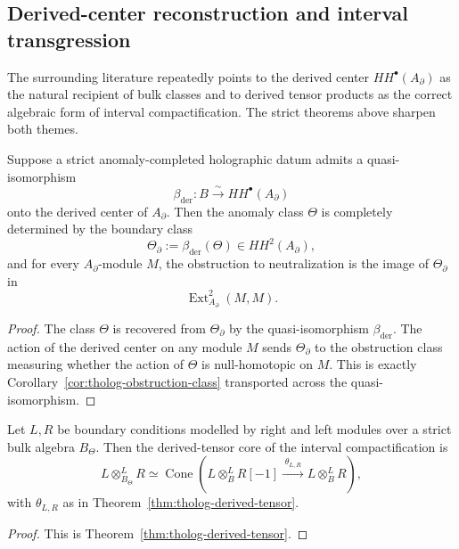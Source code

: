 \subsection{Derived-center reconstruction and interval transgression}
\label{subsec:tholog-derived-center-reconstruction}

The surrounding literature repeatedly points to the derived center \(HH^{\bullet}(A_{\partial})\) as the natural recipient of bulk classes and to derived tensor products as the correct algebraic form of interval compactification.
The strict theorems above sharpen both themes.

\begin{proposition}
\label{prop:tholog-boundary-reconstruction}
Suppose a strict anomaly-completed holographic datum admits a quasi-isomorphism
\[
\beta_{\mathrm{der}}:B\stackrel{\sim}{\longrightarrow} HH^{\bullet}(A_{\partial})
\]
onto the derived center of \(A_{\partial}\).
Then the anomaly class \(\Theta\) is completely determined by the boundary class
\[
\Theta_{\partial}:=\beta_{\mathrm{der}}(\Theta)\in HH^{2}(A_{\partial}),
\]
and for every \(A_{\partial}\)-module \(M\), the obstruction to neutralization is the image of \(\Theta_{\partial}\) in
\[
\operatorname{Ext}^{2}_{A_{\partial}}(M,M).
\]
\end{proposition}

\begin{proof}
The class \(\Theta\) is recovered from \(\Theta_{\partial}\) by the quasi-isomorphism \(\beta_{\mathrm{der}}\).
The action of the derived center on any module \(M\) sends \(\Theta_{\partial}\) to the obstruction class measuring whether the action of \(\Theta\) is null-homotopic on \(M\).
This is exactly Corollary~\ref{cor:tholog-obstruction-class} transported across the quasi-isomorphism.
\end{proof}

\begin{corollary}
\label{cor:tholog-interval-transgression-formula}
Let \(L,R\) be boundary conditions modelled by right and left modules over a strict bulk algebra \(B_{\Theta}\).
Then the derived-tensor core of the interval compactification is
\[
L\otimes^{L}_{B_{\Theta}}R
\simeq
\operatorname{Cone}\!\left(
L\otimes^{L}_{B}R[-1]
\xrightarrow{\;\theta_{L,R}\;}
L\otimes^{L}_{B}R
\right),
\]
with \(\theta_{L,R}\) as in Theorem~\ref{thm:tholog-derived-tensor}.
\end{corollary}

\begin{proof}
This is Theorem~\ref{thm:tholog-derived-tensor}.
\end{proof}

